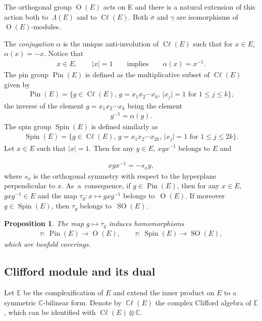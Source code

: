 \documentclass[10pt,a4paper]{amsart}
\DeclareMathOperator{\cl}{C\ell} %
\DeclareMathOperator{\ccl}{\mathbb{C}\ell} %
\DeclareMathOperator{\Spin}{Spin}
\DeclareMathOperator{\Pin}{Pin}
\DeclareMathOperator{\Or}{O}
\DeclareMathOperator{\SO}{SO}
\numberwithin{equation}{section}
\newtheorem{prop}[theor]{Proposition}
\begin{document}
The orthogonal group $\Or(E)$ acts on E and there is a natural extension of this action both to~$\Lambda(E)$ and to $\cl(E)$. Both $\sigma$ and $\gamma$ are isomorphisms of $\Or(E)$-modules.

 The \emph{conjugation} $\alpha$ is the unique anti-involution of $\cl(E)$
such that for $x\in E$, $\alpha(x) = -x$. Notice that
\begin{gather*}
x\in E,\qquad \vert x\vert = 1 \qquad \text{implies} \qquad \alpha(x) = x^{-1}.
\end{gather*}
The {pin group} $\Pin(E)$ is defined as the multiplicative subset of $\cl(E)$ given by
\begin{gather*}
\Pin(E) = \{g\in \cl(E),\, g= x_1x_2\cdots x_{k},\, \vert x_j\vert = 1 \text{ for } 1\leq j\leq k\} ,
\end{gather*}
the inverse of the element $g=x_1x_2\cdots x_{k}$ being the element
 \begin{gather*}
g^{-1} = \alpha(g) .
\end{gather*}
The {spin group} $\Spin(E)$ is defined similarly as
\begin{gather*}
\Spin(E) = \{g\in \cl(E),\, g= x_1x_2\cdots x_{2k},\, \vert x_j\vert = 1 \text{ for } 1\leq j\leq 2k\}.
\end{gather*}
Let $x\in E$ such that $\vert x\vert = 1$. Then for any $y\in E$, $xyx^{-1}$ belongs to $E$ and
{\sloppy\begin{gather*}
xyx^{-1} = -s_x y,
\end{gather*}
where $s_x$ is the orthogonal symmetry with respect to the hyperplane perpendicular to $x$. As~a~con\-sequence, if $g\in \Pin(E)$, then for any $x\in E$, $gxg^{-1}\in E$ and the map $\tau_g \colon x\mapsto gxg^{-1}$ belongs to~$\Or(E)$. If moreover $g\in \Spin(E)$, then $\tau_g$ belongs to~$\SO(E)$.

}

\begin{prop} The map $g\mapsto \tau_g$ induces homomorphisms
\begin{gather*}
\tau \colon\ \Pin(E) \to \Or(E), \qquad \tau \colon\ \Spin(E) \to\SO(E),
\end{gather*}
 which are twofold coverings.
\end{prop}

\subsection{Clifford module and its dual}

Let $\mathbb E$ be the complexification of $E$ and extend the inner product on $E$ to a symmetric $\mathbb C$-bi\-li\-near form. Denote by $\ccl(E)$ the complex Clifford algebra of $\mathbb E$, which can be identified with $\cl(E)\otimes \mathbb C$.
\end{document}
